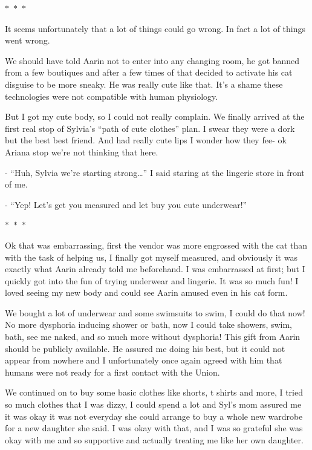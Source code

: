 \documentclass[colorlinks,12pt,a4paper]{book}
\newcommand\sep{\begin{center}
  \boldmath $\ast$~$\ast$~$\ast$
\end{center}}
\begin{document}
 \sep
 
 It seems unfortunately that a lot of things could go wrong. In fact a lot of things went wrong.\par
 \bigskip
 We should have told Aarin not to enter into any changing room, he got banned from a few boutiques and after a few times of 
 that decided to activate his cat disguise to be more sneaky. He was really cute like that. It's a shame these technologies
  were not compatible with human physiology.\par
  \bigskip
 
 But I got my cute body, so I could not really complain. We finally arrived at the first real stop of Sylvia's “path of cute 
 clothes” plan. I swear they were a dork but the best best friend. And had really cute lips I wonder how they fee- ok 
 Ariana stop we're not thinking that here.\par
 \bigskip
 
 - “Huh, Sylvia we're starting strong…” I said staring at the lingerie store in front of me.\par
 \bigskip
 - “Yep! Let's get you measured and let buy you cute underwear!”
 
 \sep
 
 Ok that was embarrassing, first the vendor was more engrossed with the cat than with the task of helping us, I finally got
  myself measured, and obviously it was exactly what Aarin already told me beforehand. I was embarrassed at first; but 
  I quickly got into the fun of trying underwear and lingerie. It was so much fun! I loved seeing my new body and could 
  see Aarin amused even in his cat form. \par
  \bigskip
 
 We bought a lot of underwear and some swimsuits to swim, I could do that now! No more dysphoria inducing shower or bath, 
 now I could take showers, swim, bath, see me naked, and so much more without dysphoria! This gift from Aarin should 
 be publicly available. He assured me doing his best, but it could not appear from nowhere and I unfortunately once 
 again agreed with him that humans were not ready for a first contact with the Union. \par
 \bigskip
 
 We continued on to buy some basic clothes like shorts, t shirts and more, I tried so much clothes that I was dizzy,
  I could spend a lot and Syl's mom assured me it was okay it was not everyday she could arrange to buy a whole new 
  wardrobe for a new daughter she said. I was okay with that, and I was so grateful she was okay with me and so supportive
   and actually treating me like her own daughter.\par
   \bigskip
 
\end{document}
